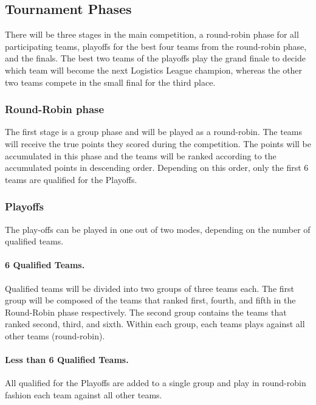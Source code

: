 \documentclass[12pt,twoside]{article}
\begin{document}
\subsection{Tournament Phases}
\label{sec:tournament-phases}
There will be three stages in the main competition, a round-robin
phase for all participating teams, playoffs for the best four teams
from the round-robin phase, and the finals. The best two teams of the
playoffs play the grand finale to decide which team will become the
next Logistics League champion, whereas the other two teams compete in
the small final for the third place.

\subsubsection{Round-Robin phase}
The first stage is a group phase and will be played as a round-robin. The teams
will receive the true points they scored during the competition. The points will
be accumulated in this phase and the teams will be ranked according to the
accumulated points in descending order. Depending on this order, only the first
6 teams are qualified for the Playoffs.

\subsubsection{Playoffs}
The play-offs can be played in one out of two modes, depending on the number of
qualified teams.

\paragraph{6 Qualified Teams.~}
Qualified teams will be divided into two groups of three teams each. The first
group will be composed of the teams that ranked first, fourth, and fifth in the
Round-Robin phase respectively. The second group contains the teams that ranked
second, third, and sixth. Within each group, each teams plays against all other
teams (round-robin).

\paragraph{Less than 6 Qualified Teams.~}
All qualified for the Playoffs are added to a single group and play in
round-robin fashion each team against all other teams.
\end{document}
